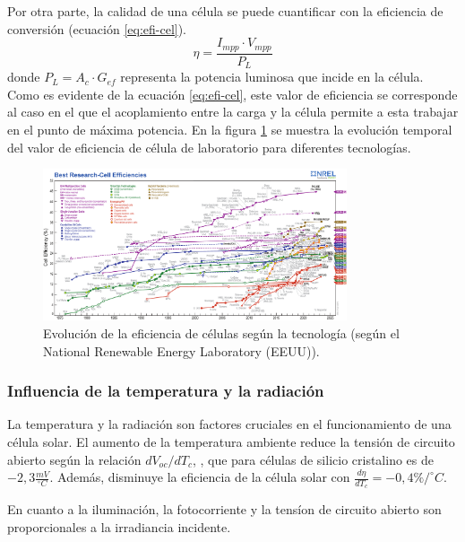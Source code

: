 Por otra parte, la calidad de una célula se puede cuantificar con la eficiencia de conversión (ecuación \ref{eq:efi-cel}).
\begin{equation}
\eta =\frac{I_{mpp}\cdot V_{mpp}}{P_L}
\label{eq:efi-cel}
\end{equation}
donde \(P_L=A_c\cdot G_{ef}\) representa la potencia luminosa que incide en la célula. Como es evidente de la ecuación \ref{eq:efi-cel}, este valor de eficiencia se corresponde al caso en el que el acoplamiento entre la carga y la célula permite a esta trabajar en el punto de máxima potencia. En la figura \ref{fig:org2ee5f72} se muestra la evolución temporal del valor de eficiencia de célula de laboratorio para diferentes tecnologías.

\begin{figure}[htbp]
\centering
\includegraphics[keepaspectratio,width=0.8\textwidth,height=0.5\textheight]{figuras/cell-efficiencies.pdf}
\caption{\label{fig:org2ee5f72}Evolución de la eficiencia de células según la tecnología (según el National Renewable Energy Laboratory \cite{nrel24} (EEUU)).}
\end{figure}

\subsubsection{Influencia de la temperatura y la radiación}
\label{sec:orga36bb52}
La temperatura y la radiación son factores cruciales en el funcionamiento de una célula solar. El aumento de la temperatura ambiente reduce la tensión de circuito abierto según la relación \(dV_{oc}/dT_c\), , que para células de silicio cristalino es de\(-2,3\frac{mV}{^\circ C}\). Además, disminuye la eficiencia de la célula solar con \(\frac{d\eta}{dT_c}=-0,4\%/^\circ C\).

En cuanto a la iluminación, la fotocorriente y la tensíon de circuito abierto son proporcionales a la irradiancia incidente.

